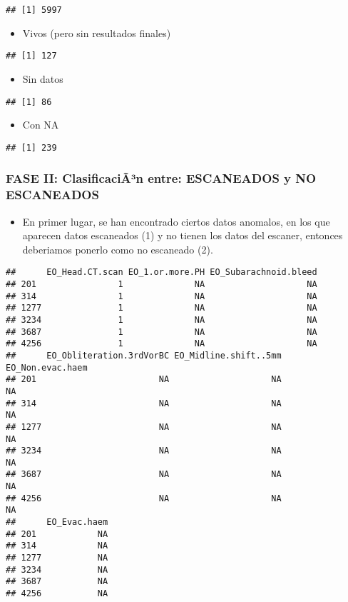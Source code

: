 \documentclass[]{article}
\providecommand{\tightlist}{%
  \setlength{\itemsep}{0pt}\setlength{\parskip}{0pt}}
\begin{document}
\begin{verbatim}
## [1] 5997
\end{verbatim}

\begin{itemize}
\tightlist
\item
  Vivos (pero sin resultados finales)
\end{itemize}

\begin{verbatim}
## [1] 127
\end{verbatim}

\begin{itemize}
\tightlist
\item
  Sin datos
\end{itemize}

\begin{verbatim}
## [1] 86
\end{verbatim}

\begin{itemize}
\tightlist
\item
  Con NA
\end{itemize}

\begin{verbatim}
## [1] 239
\end{verbatim}

\subsubsection{FASE II: ClasificaciÃ³n entre: ESCANEADOS y NO
ESCANEADOS}\label{fase-ii-clasificacian-entre-escaneados-y-no-escaneados}

\begin{itemize}
\tightlist
\item
  En primer lugar, se han encontrado ciertos datos anomalos, en los que
  aparecen datos escaneados (1) y no tienen los datos del escaner,
  entonces deberiamos ponerlo como no escaneado (2).
\end{itemize}

\begin{verbatim}
##      EO_Head.CT.scan EO_1.or.more.PH EO_Subarachnoid.bleed
## 201                1              NA                    NA
## 314                1              NA                    NA
## 1277               1              NA                    NA
## 3234               1              NA                    NA
## 3687               1              NA                    NA
## 4256               1              NA                    NA
##      EO_Obliteration.3rdVorBC EO_Midline.shift..5mm EO_Non.evac.haem
## 201                        NA                    NA               NA
## 314                        NA                    NA               NA
## 1277                       NA                    NA               NA
## 3234                       NA                    NA               NA
## 3687                       NA                    NA               NA
## 4256                       NA                    NA               NA
##      EO_Evac.haem
## 201            NA
## 314            NA
## 1277           NA
## 3234           NA
## 3687           NA
## 4256           NA
\end{verbatim}
\end{document}
